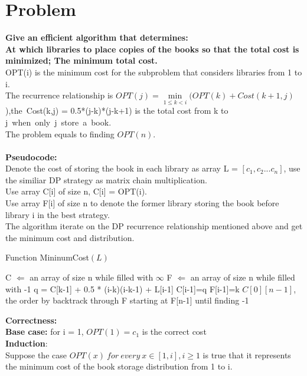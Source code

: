 \documentclass{article}
\begin{document}
\section{Problem \uppercase\expandafter{}} 
\textbf{Give an efficient algorithm that determines:\\
At which libraries to place copies of the books so that the total cost is minimized; The minimum total cost.}\\
OPT(i) is the minimum cost for the subproblem that considers libraries from 1 to i.\\
The recurrence relationship is $OPT(j) = \min\limits_{1\le k < i}(OPT(k)+Cost(k+1,j)$),the\ Cost(k,j) = 0.5*(j-k)*(j-k+1) is the total cost from k to j\ when\ only\ j\ store\ a\ book.\\
The problem equals to finding $OPT(n)$.\\\\
\textbf{\large Pseudocode:}\\
Denote the cost of storing the book in each library as array L = $[c_1,c_2...c_n]$, use the similiar DP strategy as matrix chain multiplication.\\
Use array C[i] of size n, C[i] = OPT(i).\\
Use array F[i] of size n to denote the former library storing the book before library i in the best strategy.\\
The algorithm iterate on the DP recurrence relationship mentioned above and get the minimum cost and distribution.
\begin{algorithm}[H]
  \caption{Function MininumCost$(L)$}
  \label{alg1}
  \begin{algorithmic}
  \STATE C $\Longleftarrow$ an array of size n while filled with $\infty$
  \STATE F $\Longleftarrow$ an array of size n while filled with -1
  \STATE q = C[k-1] + 0.5 * (i-k)(i-k-1) + L[i-1]
  \STATE C[i-1]=q
  \STATE F[i-1]=k
  \ENDIF
  \ENDFOR
  \ENDFOR
  \RETURN $C[0][n-1]$, the order by backtrack through F starting at F[n-1] until finding -1
  \end{algorithmic}
\end{algorithm}
\noindent\textbf{\large Correctness:\\}
\textbf{Base case: } for i = 1, $OPT(1) = c_1$ is the correct cost\\
\textbf{Induction}: \\
Suppose the case $OPT(x)\ for\ every\ x \in [1,i], i\ge 1$ is true that it represents the minimum cost of the book storage distribution from 1 to i.\\
\end{document}
